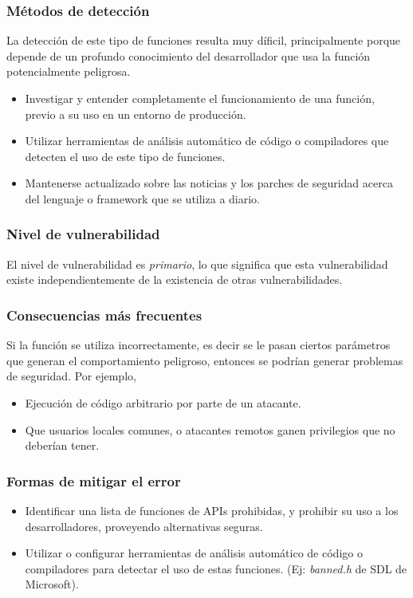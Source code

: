 \subsubsection{Métodos de detección}
La detección de este tipo de funciones resulta muy díficil, principalmente porque depende de un profundo conocimiento del desarrollador que usa la función potencialmente peligrosa.

\begin{itemize}
    \item Investigar y entender completamente el funcionamiento de una función, previo a su uso en un entorno de producción.
    \item Utilizar herramientas de análisis automático de código o compiladores que detecten el uso de este tipo de funciones.
    \item Mantenerse actualizado sobre las noticias y los parches de seguridad acerca del lenguaje o framework que se utiliza a diario.
\end{itemize}

\subsubsection{Nivel de vulnerabilidad}

El nivel de vulnerabilidad es \textit{primario}, lo que significa que esta vulnerabilidad existe independientemente de la existencia de otras vulnerabilidades.


\subsubsection{Consecuencias más frecuentes}

Si la función se utiliza incorrectamente, es decir se le pasan ciertos parámetros que generan el comportamiento peligroso, entonces se podrían generar problemas de seguridad. 
Por ejemplo,

\begin{itemize}
    \item Ejecución de código arbitrario por parte de un atacante.
    \item Que usuarios locales comunes, o atacantes remotos ganen privilegios que no deberían tener.
\end{itemize}
  
\subsubsection{Formas de mitigar el error}
\begin{itemize}
   \item Identificar una lista de funciones de APIs prohibidas, y prohibir su uso a los desarrolladores, proveyendo alternativas seguras.
   \item Utilizar o configurar herramientas de análisis automático de código o compiladores para detectar el uso de estas funciones. (Ej: \textit{banned.h} de SDL de Microsoft).
\end{itemize}

